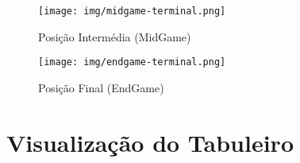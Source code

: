 \documentclass[a4paper]{article}
\begin{document}
\bigskip

\begin{figure}[h!]
\centering
\begin{minipage}{.4\textwidth}
  \centering
  \texttt{[image: img/midgame-terminal.png]}
  \caption{Posição Intermédia (MidGame)}
  \label{fig:mid}
\end{minipage}%
\begin{minipage}{.4\textwidth}
  \centering
  \texttt{[image: img/endgame-terminal.png]}
  \caption{Posição Final (EndGame)}
  \label{fig:end}
\end{minipage}
\end{figure}
\newpage
\section{Visualização do Tabuleiro}
\end{document}
